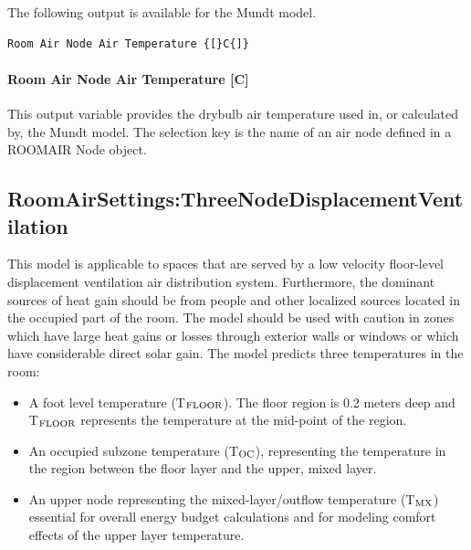 The following output is available for the Mundt model.

\begin{lstlisting}
Room Air Node Air Temperature {[}C{]}
\end{lstlisting}

\paragraph{Room Air Node Air Temperature {[}C{]}}\label{room-air-node-air-temperature-c}

This output variable provides the drybulb air temperature used in, or calculated by, the Mundt model. The selection key is the name of an air node defined in a ROOMAIR Node object.

\subsection{RoomAirSettings:ThreeNodeDisplacementVentilation}\label{roomairsettingsthreenodedisplacementventilation}

This model is applicable to spaces that are served by a low velocity floor-level displacement ventilation air distribution system. Furthermore, the dominant sources of heat gain should be from people and other localized sources located in the occupied part of the room. The model should be used with caution in zones which have large heat gains or losses through exterior walls or windows or which have considerable direct solar gain. The model predicts three temperatures in the room:

\begin{itemize}
\item
  A foot level temperature (T\(_{\rm{FLOOR}}\)). The floor region is 0.2 meters deep and T\(_{\rm{FLOOR}}\) represents the temperature at the mid-point of the region.
\item
  An occupied subzone temperature (T\(_{\rm{OC}}\)), representing the temperature in the region between the floor layer and the upper, mixed layer.
\item
  An upper node representing the mixed-layer/outflow temperature (T\(_{\rm{MX}}\)) essential for overall energy budget calculations and for modeling comfort effects of the upper layer temperature.
\end{itemize}

